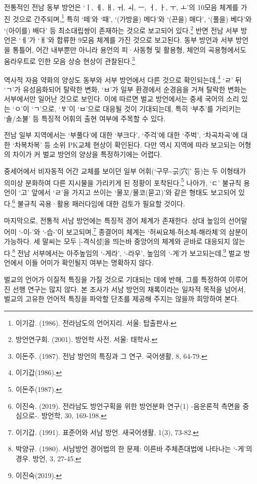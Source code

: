 전통적인 전남 동부 방언은 `ㅣ, ㅔ, ㅐ, ㅟ, ㅚ, ㅡ, ㅓ, ㅏ, ㅜ, ㅗ'의 10모음 체계를 가진 것으로 간주되며,\footnote{이기갑. (1986). 전라남도의 언어지리. 서울: 탑출판사.} 특히 `떼'와 `때', `(가방을) 메다'와 `(끈을) 매다', `(풀을) 베다'와 `(아이를) 배다' 등 최소대립쌍이 존재하는 것으로 보고되어 있다.\footnote{방언연구회. (2001). 방언학 사전. 서울: 태학사.} 반면 전남 서부 방언은 `ㅔ'가 `ㅐ'와 합류한 9모음 체계를 가진 것으로 보고된다. 동부 방언과 서부 방언을 통틀어, 어간 내부뿐만 아니라 용언의 피·사동형 및 활용형, 체언의 곡용형에서도 움라우트로 인한 모음 상승 현상이 관찰된다.\footnote{이돈주. (1987). 전남 방언의 특징과 그 연구. 국어생활, 8, 64-79.}

역사적 자음 약화의 양상도 동부와 서부 방언에서 다른 것으로 확인되는데,\footnote{이기갑(1986).} `ㄹ' 뒤 `ㄱ'가 유성음화되어 탈락한 변화, `ㅂ'가 일부 환경에서 순경음을 거쳐 탈락한 변화는 서부에서만 일어난 것으로 보인다. 이에 따르면 벌교 방언에서는 중세 국어의 소리 있는 `ㅇ'이 `ㄱ'으로, `ㅸ'이 `ㅂ'으로 대응될 것이 기대되는데, 특히 `부추'를 가리키는 `솔/소불' 등 특징적 어휘의 출현 여부에 주목할 수 있다.

전남 일부 지역에서는 `부풀다'에 대한 `부크다', `주걱'에 대한 `주벅', `차곡차곡'에 대한 `차복차복' 등 소위 PK교체 현상이 확인된다. 다만 역시 지역에 따라 보고되는 어형의 차이가 커 벌교 방언의 양상을 특정하기에는 어렵다.

중세어에서 비자동적 어간 교체를 보이던 일부 어휘(`구무\textasciitilde{}구ᇚ[穴]' 등)는 두 이형태가 의미상 분화하여 다른 지시물을 가리키게 된 정황이 포착된다.\footnote{이돈주(1987).} 나아가, `ㄷ' 불규칙 용언이 `고' 앞에서 `ㄹ'을 가지고 쓰이는 `물꼬/물코(묻고)'와 같은 형태도 보고되어 있다.\footnote{이진숙. (2019).  전라남도 방언구획을 위한 방언분화 연구(1) -음운론적 측면을 중심으로-. 방언학, 30, 169-198.} 불규칙 곡용·활용 패러다임에 대한 검토가 필요할 것이다.

마지막으로, 전통적 서남 방언에는 특징적 경어 체계가 존재한다. 상대 높임의 선어말어미 `-이-'와 `-습-'이 보고되며,\footnote{이기갑. (1991). 표준어와 서남 방언. 새국어생활, 1(3), 73-82.} 종결어미 체계는 `허씨요체-허소체-해라체'의 삼분이 가능하다. 세 말씨는 모두 [-격식성]을 띄는바 중앙어의 체계와 곧바로 대응되지 않는다.\footnote{박양규. (1980). 서남방언 경어법의 한 문제: 이른바 주체존대법에 나타나는 `-게'의 경우. 방언, 3, 27-45.} 전남 서부에서는 아주높임의 `-게라', `-라우', 높임의 `-게'가 보고되는데,\footnote{이진숙(2019).} 벌교 방언에서 이들 어미가 확인될지 여부는 명확하지 않다.

벌교의 언어가 이질적 특징을 가질 것으로 기대되는 데에 반해, 그를 특정하여 이루어진 선행 연구는 많지 않다. 본 조사가 서남 방언의 채록이라는 일차적 목적을 넘어서, 벌교의 고유한 언어적 특징을 파악할 단초를 제공해 주지는 않을까 희망하여 본다.
